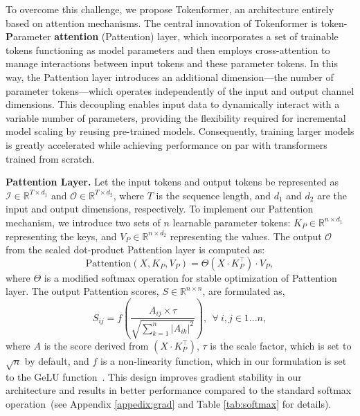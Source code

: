\documentclass{article} %
\newcommand{\ourmethod}{Tokenformer\xspace}
\begin{document}
To overcome this challenge, we propose {\ourmethod}, an architecture entirely based on attention mechanisms. The central innovation of \ourmethod is token-\textbf{P}arameter \textbf{attention} (Pattention) layer, which incorporates a set of trainable tokens functioning as model parameters and then employs cross-attention to manage interactions between input tokens and these parameter tokens. In this way, the Pattention layer introduces an additional dimension—the number of parameter tokens—which operates independently of the input and output channel dimensions. This decoupling enables input data to dynamically interact with a variable number of parameters, providing the flexibility required for incremental model scaling by reusing pre-trained models. Consequently, training larger models is greatly accelerated while achieving performance on par with transformers trained from scratch.

\textbf{Pattention Layer.} Let the input tokens and output tokens be represented as $\mathcal{I} \in \mathbb{R}^{T \times d_1}$ and $\mathcal{O} \in \mathbb{R}^{T \times d_2}$, where $T$ is the sequence length, and $d_1$ and $d_2$ are the input and output dimensions, respectively. To implement our Pattention mechanism,  we introduce two sets of $n$ learnable parameter tokens: $K_P \in \mathbb{R}^{n \times d_1}$ representing the keys, and $V_P \in \mathbb{R}^{n \times d_2}$ representing the values.
The output $\mathcal{O}$ from the scaled dot-product Pattention layer is computed as:
\begin{equation}
    \text{Pattention}(X, K_P, V_P) = \Theta\left(X \cdot K_P^{\top}\right) \cdot V_P,
    \label{eq:token-parameter-1}
\end{equation}
where $\Theta$ is a modified softmax operation for stable optimization of Pattention layer. The output Pattention scores, $S \in \mathbb{R}^{n \times n}$, are formulated as, 
\begin{equation}
    S_{ij} = f\left(\frac{A_{ij} \times \tau}{\sqrt{\sum_{k=1}^n |A_{ik}|^2}}\right), ~~\forall~i,j \in 1...n,
    \label{eq:token-parameter-2}
\end{equation}
where $A$ is the score derived from $(X \cdot K_P^{\top})$, $\tau$ is the scale factor, which is set to $\sqrt{n}$ by default, and $f$ is a non-linearity function, which in our formulation is set to the GeLU function~\citep{hendrycks2016gaussian}. This design improves gradient stability in our architecture and results in better performance compared to the standard softmax operation~(see Appendix \ref{appedix:grad} and Table \ref{tab:softmax} for details).
\end{document}
